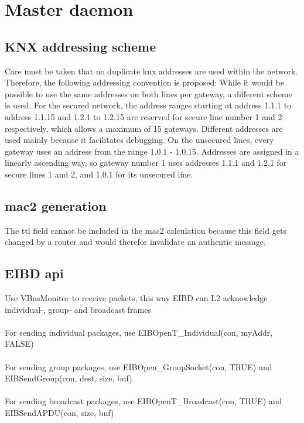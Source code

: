 \label{chap5}
\section{Master daemon}

\subsection{KNX addressing scheme}

Care must be taken that no duplicate \gls{knx} addresses are used within the network. Therefore, the following addressing convention is proposed:
While it would be possible to use the same addresses on both lines per gateway, a different scheme is used.
For the secured network, the address ranges starting at address 1.1.1 to address 1.1.15 and 1.2.1 to 1.2.15 are reserved for secure line number
1 and 2 respectively, which allows a maximum of 15 gateways. Different addresses are used mainly because it facilitates debugging. 
On the unsecured lines, every gateway uses an address from the range 1.0.1 - 1.0.15. Addresses are assigned in a linearly ascending way, so gateway number 1
uses addresses 1.1.1 and 1.2.1 for secure lines 1 and 2, and 1.0.1 for its unsecured line.

\subsection{\gls{mac2} generation}

The \gls{ttl} field cannot be included in the \gls{mac2} calculation because this field gets changed by a router and would therefor invalidate an authentic message.

\subsection{EIBD \gls{api}}

Use VBusMonitor to receive packets, this way EIBD can L2 acknowledge individual-, group- and broadcast frames
\\
\\
For sending individual packages, use EIBOpenT\_Individual(con, myAddr, FALSE)
\\
\\
For sending group packages, use EIBOpen\_GroupSocket(con, TRUE) and EIBSendGroup(con, dest, size, buf)
\\
\\
For sending broadcast packages, use EIBOpenT\_Broadcast(con, TRUE) and EIBSendAPDU(con, size, buf)

